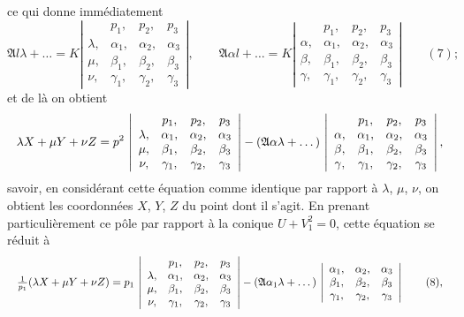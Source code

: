 \documentclass[11pt]{article}
\begin{document}
\noindent ce qui donne imm\'ediatement
\[
\mathfrak{A} l \lambda + \dots = K \left|\begin{array}{cccc}
 & p_{1}, & p_{2}, & p_{3} \\
\lambda, & \alpha_{1}, & \alpha_{2}, & \alpha_{3} \\
\mu, & \beta_{1}, & \beta_{2}, & \beta_{3} \\
\nu, & \gamma_{1}, & \gamma_{2}, & \gamma_{3}
\end{array}\right|,\qquad
\mathfrak{A}\alpha l + \dots = K \left|\begin{array}{cccc}
 & p_{1}, & p_{2}, & p_{3} \\
\alpha, & \alpha_{1}, & \alpha_{2}, & \alpha_{3} \\
\beta, & \beta_{1}, & \beta_{2}, & \beta_{3} \\
\gamma, & \gamma_{1}, & \gamma_{2}, & \gamma_{3}
\end{array}\right|\qquad (7);
\]
et de l\`a on obtient
\[ \resizebox{\textwidth}{!}{$\displaystyle
\lambda X + \mu Y + \nu Z = p^{2}\,\left|\begin{array}{cccc}
 & p_{1}, & p_{2}, & p_{3} \\
\lambda, & \alpha_{1}, & \alpha_{2}, & \alpha_{3} \\
\mu, & \beta_{1}, & \beta_{2}, & \beta_{3} \\
\nu, & \gamma_{1}, & \gamma_{2}, & \gamma_{3}
\end{array}\right|
- (\mathfrak{A}\alpha\lambda + \dots)\,\left|\begin{array}{cccc}
 & p_{1}, & p_{2}, & p_{3} \\
\alpha, & \alpha_{1}, & \alpha_{2}, & \alpha_{3} \\
\beta, & \beta_{1}, & \beta_{2}, & \beta_{3} \\
\gamma, & \gamma_{1}, & \gamma_{2}, & \gamma_{3}
\end{array}\right|,
$} \]
savoir, en consid\'erant cette \'equation comme identique par rapport \`a $\lambda$, $\mu$, $\nu$, on obtient les coordonn\'ees $X$, $Y$, $Z$ du point dont il s'agit. En prenant particuli\`erement ce p\^ole par rapport \`a la conique $U + V_{1}^{2} = 0$, cette \'equation se r\'eduit \`a
\[ \resizebox{\textwidth}{!}{$\displaystyle
\tfrac{1}{p_{1}}(\lambda X + \mu Y + \nu Z) = p_{1}\,\left|\begin{array}{cccc}
 & p_{1}, & p_{2}, & p_{3} \\
\lambda, & \alpha_{1}, & \alpha_{2}, & \alpha_{3} \\
\mu, & \beta_{1}, & \beta_{2}, & \beta_{3} \\
\nu, & \gamma_{1}, & \gamma_{2}, & \gamma_{3}
\end{array}\right|
- (\mathfrak{A}\alpha_{1}\lambda + \dots)\,\left|\begin{array}{ccc}
\alpha_{1}, & \alpha_{2}, & \alpha_{3} \\
\beta_{1}, & \beta_{2}, & \beta_{3} \\
\gamma_{1}, & \gamma_{2}, & \gamma_{3}
\end{array}\right|\qquad (8),
$} \]
\end{document}
